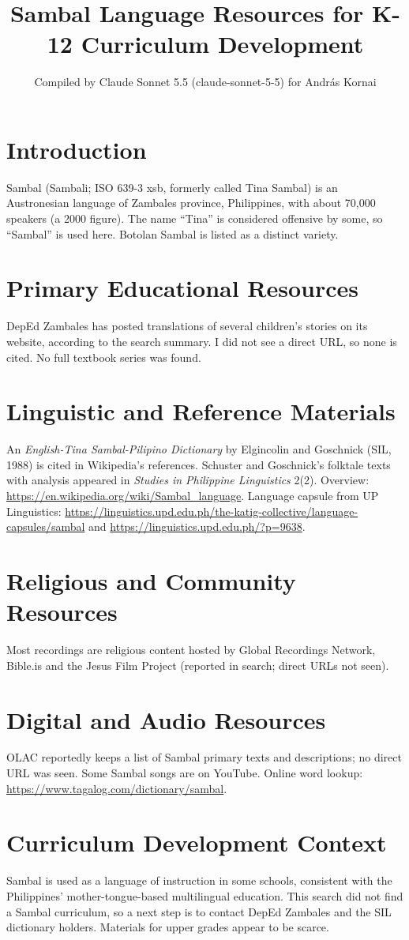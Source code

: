 \documentclass[12pt]{article}
\title{Sambal Language Resources for K-12 Curriculum Development}
\author{Compiled by Claude Sonnet 5.5 (claude-sonnet-5-5) for Andr\'as Kornai}
\date{}
\begin{document}
\maketitle

\section{Introduction}
Sambal (Sambali; ISO 639-3 xsb, formerly called Tina Sambal) is an Austronesian language of Zambales province, Philippines, with about 70,000 speakers (a 2000 figure). The name ``Tina'' is considered offensive by some, so ``Sambal'' is used here. Botolan Sambal is listed as a distinct variety.

\section{Primary Educational Resources}
DepEd Zambales has posted translations of several children's stories on its website, according to the search summary. I did not see a direct URL, so none is cited. No full textbook series was found.

\section{Linguistic and Reference Materials}
An \textit{English-Tina Sambal-Pilipino Dictionary} by Elgincolin and Goschnick (SIL, 1988) is cited in Wikipedia's references. Schuster and Goschnick's folktale texts with analysis appeared in \textit{Studies in Philippine Linguistics} 2(2). Overview: \url{https://en.wikipedia.org/wiki/Sambal_language}. Language capsule from UP Linguistics: \url{https://linguistics.upd.edu.ph/the-katig-collective/language-capsules/sambal} and \url{https://linguistics.upd.edu.ph/?p=9638}.

\section{Religious and Community Resources}
Most recordings are religious content hosted by Global Recordings Network, Bible.is and the Jesus Film Project (reported in search; direct URLs not seen).

\section{Digital and Audio Resources}
OLAC reportedly keeps a list of Sambal primary texts and descriptions; no direct URL was seen. Some Sambal songs are on YouTube. Online word lookup: \url{https://www.tagalog.com/dictionary/sambal}.

\section{Curriculum Development Context}
Sambal is used as a language of instruction in some schools, consistent with the Philippines' mother-tongue-based multilingual education. This search did not find a Sambal curriculum, so a next step is to contact DepEd Zambales and the SIL dictionary holders. Materials for upper grades appear to be scarce.
\end{document}
